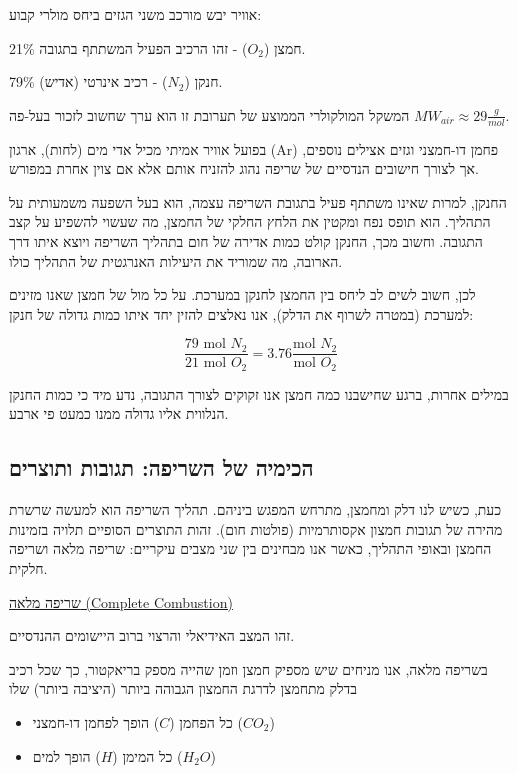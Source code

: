 \documentclass[
  hebrew,
  letterpaper,
  DIV=11,
  numbers=noendperiod]{scrreprt}
\begin{document}
אוויר יבש מורכב משני הגזים ביחס מולרי קבוע:

21\% חמצן (\(O_{2}\)) - זהו הרכיב הפעיל המשתתף בתגובה.

79\% חנקן (\(N_{2}\)) - רכיב אינרטי (אדיש).

המשקל המולקולרי הממוצע של תערובת זו הוא ערך שחשוב לזכור בעל-פה
\(MW_{air} \approx 29\frac{g}{mol}\).

בפועל אוויר אמיתי מכיל אדי מים (לחות), ארגון (Ar) פחמן דו-חמצני וגזים
אצילים נוספים, אך לצורך חישובים הנדסיים של שריפה נהוג להזניח אותם אלא אם
צוין אחרת במפורש.

החנקן, למרות שאינו משתתף פעיל בתגובת השריפה עצמה, הוא בעל השפעה משמעותית
על התהליך. הוא תופס נפח ומקטין את הלחץ החלקי של החמצן, מה שעשוי להשפיע
על קצב התגובה. וחשוב מכך, החנקן קולט כמות אדירה של חום בתהליך השריפה
ויוצא איתו דרך הארובה, מה שמוריד את היעילות האנרגטית של התהליך כולו.

לכן, חשוב לשים לב ליחס בין החמצן לחנקן במערכת. על כל מול של חמצן שאנו
מזינים למערכת (במטרה לשרוף את הדלק), אנו נאלצים להזין יחד איתו כמות
גדולה של חנקן:

\[\frac{79\text{ mol }N_{2}}{21\text{ mol }O_{2}} = 3.76\frac{\text{mol }N_{2}}{\text{mol }O_{2}}\]

במילים אחרות, ברגע שחישבנו כמה חמצן אנו זקוקים לצורך התגובה, נדע מיד כי
כמות החנקן הנלווית אליו גדולה ממנו כמעט פי ארבע.

\subsection{הכימיה של השריפה: תגובות
ותוצרים}\label{ux5d4ux5dbux5d9ux5deux5d9ux5d4-ux5e9ux5dc-ux5d4ux5e9ux5e8ux5d9ux5e4ux5d4-ux5eaux5d2ux5d5ux5d1ux5d5ux5ea-ux5d5ux5eaux5d5ux5e6ux5e8ux5d9ux5dd}

כעת, כשיש לנו דלק ומחמצן, מתרחש המפגש ביניהם. תהליך השריפה הוא למעשה
שרשרת מהירה של תגובות חמצון אקסותרמיות (פולטות חום). זהות התוצרים
הסופיים תלויה בזמינות החמצן ובאופי התהליך, כאשר אנו מבחינים בין שני
מצבים עיקריים: שריפה מלאה ושריפה חלקית.

\ul{שריפה מלאה (Complete Combustion)}

זהו המצב האידיאלי והרצוי ברוב היישומים ההנדסיים.

בשריפה מלאה, אנו מניחים שיש מספיק חמצן וזמן שהייה מספק בריאקטור, כך שכל
רכיב בדלק מתחמצן לדרגת החמצון הגבוהה ביותר (היציבה ביותר) שלו

\begin{itemize}
\item
  כל הפחמן (\(C\)) הופך לפחמן דו-חמצני (\(CO_{2}\))
\item
  כל המימן (\(H\)) הופך למים (\(H_{2}O\))
\end{itemize}
\end{document}
